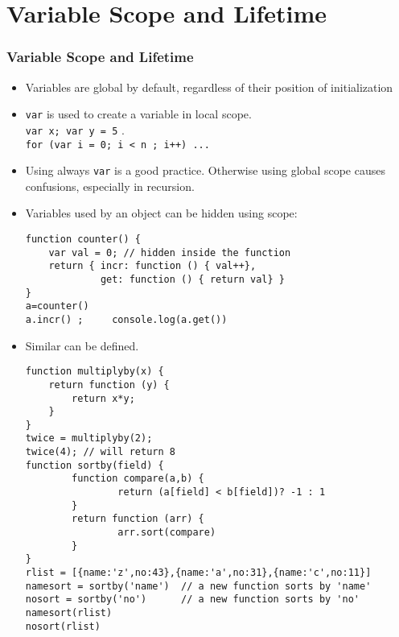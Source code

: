\documentclass[trans,compress,xcolor=table]{beamer}
\begin{document}
\section{Variable Scope and Lifetime}
\begin{frame}[fragile]
\frametitle{Variable Scope and Lifetime}
\begin{itemize}
\item Variables are global by default, regardless of their
	position of initialization 
\item \lstinline!var! is used to create a variable in
	local scope.\\ \lstinline!var x; var y = 5! .\\
	\lstinline!for (var i = 0; i < n ; i++) ...! \\
\item Using always \lstinline!var! is a good practice. Otherwise
	using global scope causes confusions, especially in
	recursion.
\item Variables used by an object can be hidden using scope:
\begin{lstlisting}
function counter() {
    var val = 0; // hidden inside the function
    return { incr: function () { val++},
             get: function () { return val} }
}
a=counter()
a.incr() ;     console.log(a.get())
\end{lstlisting}
\end{itemize}
\end{frame}

\begin{frame}[fragile]
\begin{itemize}
\item Similar  can be defined.
\begin{lstlisting}
function multiplyby(x) {
    return function (y) {
        return x*y;
    }
}
twice = multiplyby(2);
twice(4); // will return 8
function sortby(field) {  
        function compare(a,b) { 
                return (a[field] < b[field])? -1 : 1
        }  
        return function (arr) { 
                arr.sort(compare)
        }
}
rlist = [{name:'z',no:43},{name:'a',no:31},{name:'c',no:11}]
namesort = sortby('name')  // a new function sorts by 'name'
nosort = sortby('no')	   // a new function sorts by 'no'
namesort(rlist)
nosort(rlist)
\end{lstlisting}
\end{itemize}
\end{frame}
\end{document}
